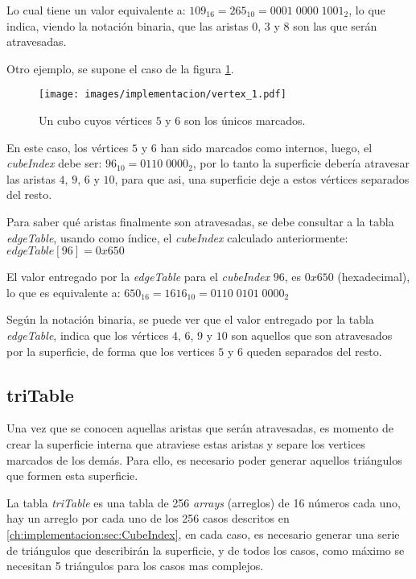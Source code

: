 Lo cual tiene un valor equivalente a: $109_{16} = 265_{10} = 0001 \; 0000 \; 1001_{2}$, lo que indica, viendo la notación binaria, que las aristas $0$, $3$ y $8$ son las que serán atravesadas.

Otro ejemplo, se supone el caso de la figura \ref{f:ch:implementacion:sec:CubeIndex:edgeTable:vertex_1}.

\begin{figure}[hbt]
	\centering
	\fbox
	{
		\texttt{[image: images/implementacion/vertex\_1.pdf]}
	}
	\caption{Un cubo cuyos vértices $5$ y $6$ son los únicos marcados.}
	\label{f:ch:implementacion:sec:CubeIndex:edgeTable:vertex_1}
\end{figure}

En este caso, los vértices $5$ y $6$ han sido marcados como internos, luego, el \emph{cubeIndex} debe ser: $96_{10} = 0110 \; 0000_{2}$, por lo tanto la superficie debería atravesar las aristas $4$, $9$, $6$ y $10$, para que asi, una superficie deje a estos vértices separados del resto.

Para saber qué aristas finalmente son atravesadas, se debe consultar a la tabla \emph{edgeTable}, usando como índice, el \emph{cubeIndex} calculado anteriormente: $edgeTable[96] = 0x650$

El valor entregado por la \emph{edgeTable} para el \emph{cubeIndex} $96$, es $0x650$ (hexadecimal), lo que es equivalente a: $650_{16} = 1616_{10} = 0110 \; 0101 \; 0000_{2}$

Según la notación binaria, se puede ver que el valor entregado por la tabla \emph{edgeTable}, indica que los vértices $4$, $6$, $9$ y $10$ son aquellos que son atravesados por la superficie, de forma que los vertices $5$ y $6$ queden separados del resto.

\subsection{triTable}
\label{ch:implementacion:sec:triTable}

Una vez que se conocen aquellas aristas que serán atravesadas, es momento de crear la superficie interna que atraviese estas aristas y separe los vertices marcados de los demás. Para ello, es necesario poder generar aquellos triángulos que formen esta superficie.

La tabla \emph{triTable} es una tabla de 256 \emph{arrays} (arreglos) de 16 números cada uno, hay un arreglo por cada uno de los 256 casos descritos en \ref{ch:implementacion:sec:CubeIndex}, en cada caso, es necesario generar una serie de triángulos que describirán la superficie, y de todos los casos, como máximo se necesitan 5 triángulos para los casos mas complejos.

